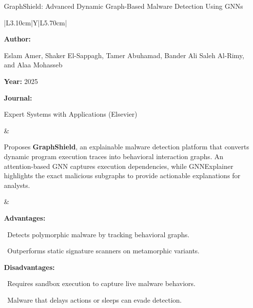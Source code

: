 \begin{frame}[t]{GraphShield: Advanced Dynamic Graph-Based Malware Detection Using GNNs}
\vspace{-0.30em}
{\footnotesize\setlength{\tabcolsep}{3.5pt}\renewcommand{\arraystretch}{1.10}
\begin{tabularx}{\textwidth}{|L{3.10cm}|Y|L{5.70cm}|}
\hline\lrhdr\hline
\begin{minipage}[t]{\linewidth}\fontsize{7.2pt}{9.2pt}\raggedright\selectfont
\textbf{Author:}\par
Eslam Amer, Shaker El-Sappagh, Tamer Abuhamad, Bander Ali Saleh Al-Rimy, and Alaa Mohasseb\par\vspace{4pt}
\textbf{Year:} 2025\par\vspace{4pt}
\textbf{Journal:}\par
Expert Systems with Applications (Elsevier)\par\vspace{4pt}
\end{minipage}
&
\begin{minipage}[t]{\linewidth}\fontsize{7.2pt}{9.2pt}\raggedright\selectfont
Proposes \textbf{GraphShield}, an explainable malware detection platform that converts dynamic program execution traces into behavioral interaction graphs. An attention-based GNN captures execution dependencies, while GNNExplainer highlights the exact malicious subgraphs to provide actionable explanations for analysts.\par\vspace{4pt}
\end{minipage}
&
\begin{minipage}[t]{\linewidth}\fontsize{7.2pt}{9.0pt}\raggedright\selectfont
\textcolor{strengthGreen}{\textbf{Advantages:}}\par\vspace{1.5pt}
\textbullet~Detects polymorphic malware by tracking behavioral graphs.\par\vspace{2.0pt}\textbullet~Outperforms static signature scanners on metamorphic variants.\par\vspace{4.0pt}
\textcolor{limitRed}{\textbf{Disadvantages:}}\par\vspace{1.5pt}
\textbullet~Requires sandbox execution to capture live malware behaviors.\par\vspace{2.0pt}\textbullet~Malware that delays actions or sleeps can evade detection.\par\vspace{4pt}
\end{minipage} \\\hline
\end{tabularx}}
\end{frame}

